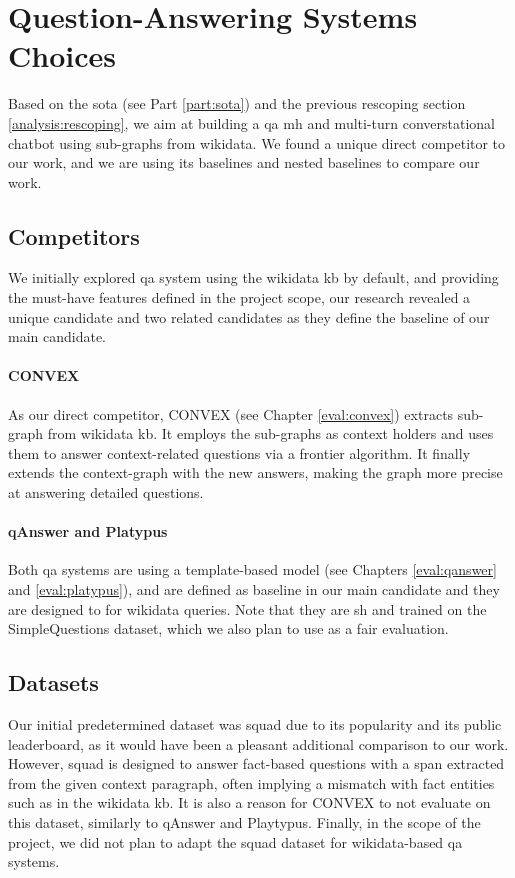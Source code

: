 \section{Question-Answering Systems Choices}
Based on the \gls{sota} (see Part \ref{part:sota}) and the previous rescoping section \ref{analysis:rescoping}, we aim at building a \gls{qa} \gls{mh} and multi-turn converstational chatbot using sub-graphs from \gls{wikidata}. We found a unique direct competitor to our work, and we are using its baselines and nested baselines to compare our work.

\subsection{Competitors}
We initially explored \gls{qa} system using the \gls{wikidata} \gls{kb} by default, and providing the must-have features defined in the project scope, our research revealed a unique candidate and two related candidates as they define the baseline of our main candidate.

\paragraph{CONVEX}
As our direct competitor, CONVEX \autocite{paper:convex} (see Chapter \ref{eval:convex}) extracts sub-graph from \gls{wikidata} \gls{kb}. It employs the sub-graphs as context holders and uses them to answer context-related questions via a frontier algorithm. It finally extends the context-graph with the new answers, making the graph more precise at answering detailed questions.

\paragraph{qAnswer and Platypus}
Both \gls{qa} systems are using a template-based model (see Chapters \ref{eval:qanswer} and \ref{eval:platypus}), and are defined as baseline in our main candidate and they are designed to for \gls{wikidata} queries. Note that they are \gls{sh} and trained on the SimpleQuestions dataset, which we also plan to use as a fair evaluation.


\subsection{Datasets}
Our initial predetermined dataset was \gls{squad} due to its popularity and its public leaderboard, as it would have been a pleasant additional comparison to our work. However, \gls{squad} is designed to answer fact-based questions with a span extracted from the given context paragraph, often implying a mismatch with fact entities such as in the \gls{wikidata} \gls{kb}. It is also a reason for CONVEX to not evaluate on this dataset, similarly to qAnswer and Playtypus. Finally, in the scope of the project, we did not plan to adapt the \gls{squad} dataset for \gls{wikidata}-based \gls{qa} systems.

